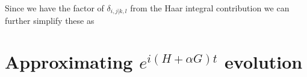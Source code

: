 \documentclass{article}
\begin{document}
 Since we have the factor of $\delta_{i,j | k,l}$ from the Haar integral contribution we can further simplify these as
\section{Approximating $e^{i (H + \alpha G) t}$ evolution}



\end{document}
